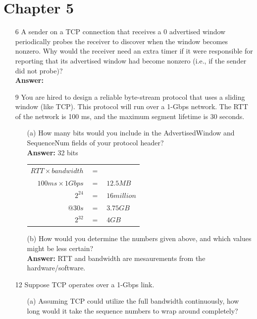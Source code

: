 \documentclass[a4paper]{article}
\begin{document}
\section*{Chapter 5}
\begin{itemize}
	\item[6] A sender on a TCP connection that receives a 0 advertised window periodically probes the receiver to discover when the window becomes nonzero. Why would the receiver need an extra timer if it were responsible for reporting that its advertised window had become nonzero (i.e., if the sender did not probe)? \\
	      \textbf{Answer:} 
	\item[9] You are hired to design a reliable byte-stream protocol that uses a sliding window (like TCP). This protocol will run over a 1-Gbps network. The RTT of the network is 100 ms, and the maximum segment lifetime is 30 seconds.
	      \begin{itemize}
	      	\item[(a)] How many bits would you include in the AdvertisedWindow and SequenceNum fields of your protocol header? \\
	      	      \textbf{Answer:} 32 bits \\
	      	      \begin{tabular}{rcl}
	      	      	$RTT \times bandwidth$ & $=$ &              \\
	      	      	$100ms \times 1Gbps$   & $=$ & $12.5MB$     \\
	      	      	$2^24$                 & $=$ & $16 million$ \\
	      	      	$@30s$                 & $=$ & $3.75GB$     \\
	      	      	$2^32$                 & $=$ & $4GB$        
	      	      \end{tabular}
	      	\item[(b)] How would you determine the numbers given above, and which values might be less certain? \\
	      	      \textbf{Answer:} RTT and bandwidth are mesaurements from the hardware/software.
	      \end{itemize}
	\item[12] Suppose TCP operates over a 1-Gbps link.
	      \begin{itemize}
	      	\item[(a)] Assuming TCP could utilize the full bandwidth continuously, how long would it take the sequence numbers to wrap around completely? \\

\end{itemize}
\end{itemize}
\end{document}
